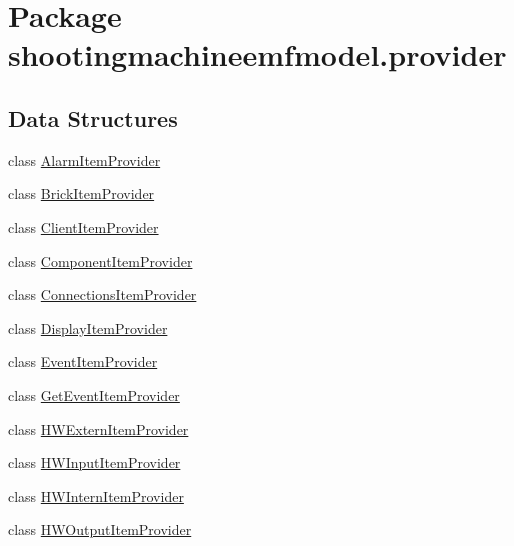 \hypertarget{namespaceshootingmachineemfmodel_1_1provider}{\section{Package shootingmachineemfmodel.\-provider}
\label{namespaceshootingmachineemfmodel_1_1provider}
}
\subsection*{Data Structures}
\begin{DoxyCompactItemize}
\item 
class \hyperlink{classshootingmachineemfmodel_1_1provider_1_1_alarm_item_provider}{Alarm\-Item\-Provider}
\item 
class \hyperlink{classshootingmachineemfmodel_1_1provider_1_1_brick_item_provider}{Brick\-Item\-Provider}
\item 
class \hyperlink{classshootingmachineemfmodel_1_1provider_1_1_client_item_provider}{Client\-Item\-Provider}
\item 
class \hyperlink{classshootingmachineemfmodel_1_1provider_1_1_component_item_provider}{Component\-Item\-Provider}
\item 
class \hyperlink{classshootingmachineemfmodel_1_1provider_1_1_connections_item_provider}{Connections\-Item\-Provider}
\item 
class \hyperlink{classshootingmachineemfmodel_1_1provider_1_1_display_item_provider}{Display\-Item\-Provider}
\item 
class \hyperlink{classshootingmachineemfmodel_1_1provider_1_1_event_item_provider}{Event\-Item\-Provider}
\item 
class \hyperlink{classshootingmachineemfmodel_1_1provider_1_1_get_event_item_provider}{Get\-Event\-Item\-Provider}
\item 
class \hyperlink{classshootingmachineemfmodel_1_1provider_1_1_h_w_extern_item_provider}{H\-W\-Extern\-Item\-Provider}
\item 
class \hyperlink{classshootingmachineemfmodel_1_1provider_1_1_h_w_input_item_provider}{H\-W\-Input\-Item\-Provider}
\item 
class \hyperlink{classshootingmachineemfmodel_1_1provider_1_1_h_w_intern_item_provider}{H\-W\-Intern\-Item\-Provider}
\item 
class \hyperlink{classshootingmachineemfmodel_1_1provider_1_1_h_w_output_item_provider}{H\-W\-Output\-Item\-Provider}
\item 

\end{DoxyCompactItemize}
